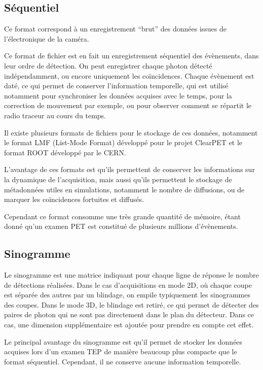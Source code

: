 		\subsection{Séquentiel}

Ce format correspond à un enregistrement ``brut'' des données issues de l'électronique de la caméra.

Ce format de fichier est en fait un enregistrement séquentiel des évènements, dans leur ordre de détection. On peut enregistrer chaque photon détecté indépendamment, ou encore uniquement les coïncidences. Chaque évènement est daté, ce qui permet de conserver l’information temporelle, qui est utilisé notamment pour synchroniser les données acquises avec le temps, pour la correction de mouvement par exemple, ou pour observer comment se répartit le radio traceur au cours du temps.

Il existe plusieurs formats de fichiers pour le stockage de ces données, notamment le format LMF (List-Mode Format) développé pour le projet ClearPET et le format ROOT développé par le CERN. 

L'avantage de ces formats est qu'ils permettent de conserver les informations sur la dynamique de l'acquisition, mais aussi qu'ils permettent le stockage de métadonnées utiles en simulations, notamment le nombre de diffusions, ou de marquer les coïncidences fortuites et diffusés.

Cependant ce format consomme une très grande quantité de mémoire, étant donné qu'un examen PET est constitué de plusieurs millions d'évènements.

		\subsection{Sinogramme}

Le sinogramme est une matrice indiquant pour chaque ligne de réponse le nombre de détections réalisées. Dans le cas d'acquisitions en mode 2D, où chaque coupe est séparée des autres par un blindage, on empile typiquement les sinogrammes des coupes. Dans le mode 3D, le blindage est retiré, ce qui permet de détecter des paires de photon qui ne sont pas directement dans le plan du détecteur. Dans ce cas, une dimension supplémentaire est ajoutée pour prendre en compte cet effet.

Le principal avantage du sinogramme est qu'il permet de stocker les données acquises lors d'un examen TEP de manière beaucoup plus compacte que le format séquentiel. Cependant, il ne conserve aucune information temporelle.


